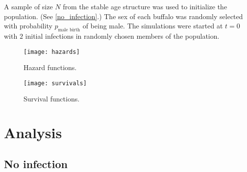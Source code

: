 \documentclass{jpmarticle}
\begin{document}
A sample of size $N$ from the stable age structure was used to
initialize the population.  (See \autoref{no_infection}.)  The sex of
each buffalo was randomly selected with probability
$p_{\text{male birth}}$ of being male.  The simulations were started
at $t = 0$ with $2$ initial infections in randomly chosen members of
the population.


\begin{figure}
  \centering
  \texttt{[image: hazards]}
  \caption{Hazard functions.}
  \label{fig:hazard}
\end{figure}


\begin{figure}
  \centering
  \texttt{[image: survivals]}
  \caption{Survival functions.}
  \label{fig:survival}
\end{figure}



\clearpage
\section{Analysis}

\subsection{No infection}
\label{no_infection}
\end{document}
